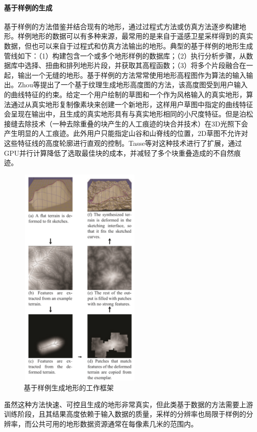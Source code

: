 \paragraph{基于样例的生成}
基于样例的方法借鉴并结合现有的地形，通过过程式方法或仿真方法逐步构建地形。样例地形的数据可以有多种来源，最常用的是来自于遥感卫星采样得到的真实数据，但也可以来自于过程式和仿真方法输出的地形。典型的基于样例的地形生成管线如下：（1）构建包含一个或多个地形样例的数据库；（2）执行分析步骤，从数据库中选择、扭曲和排列地形片段，并获取其高程函数；（3）将多个片段融合在一起，输出一个无缝的地形。基于样例的方法常常使用地形高程图作为算法的输入输出。Zhou等\supercite{Zhou2007Terrain}提出了一个基于纹理生成地形高度图的方法，该高度图受到用户输入的曲线特征的约束。给定一个用户绘制的草图和一个作为风格输入的真实地形，算法通过从真实地形复制像素块来创建一个新地形，这样用户草图中指定的曲线特征会呈现在输出中，且生成的真实地形具有与真实地形相同的小尺度特征。但是泊松接缝去除技术（一种去除重叠的块产生的人工痕迹的块合并技术）在3D光照下会产生明显的人工痕迹。此外用户只能指定山谷和山脊线的位置，2D草图不允许对这些特征线的高度轮廓进行直观的控制。Tasse\supercite{TasseEnhanced}等对这种技术进行了扩展，通过GPU并行计算降低了选取最佳块的成本，并减轻了多个块重叠造成的不自然痕迹。\par
\begin{figure}[htbp]
\centering
\includegraphics[height=11cm,width=6cm]{figures/patchBased.PNG}
\caption{基于样例生成地形的工作框架\supercite{TasseEnhanced}}
\end{figure}
虽然这种方法快速、可控且生成的地形非常真实，但此类基于数据的方法需要上游训练阶段，且其结果高度依赖于输入数据的质量，采样的分辨率也局限于样例的分辨率，而公共可用的地形数据资源通常在每像素几米的范围内。

